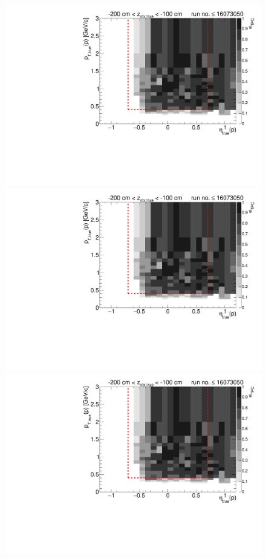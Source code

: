 \begin{figure}[hb]
{  \includegraphics[width=\linewidth,page=6]{graphics/eff/Eff2D_TPC_proton_Plus_RunRange1.pdf}\\
  \includegraphics[width=\linewidth,page=8]{graphics/eff/Eff2D_TPC_proton_Plus_RunRange1.pdf}\\
  \includegraphics[width=\linewidth,page=10]{graphics/eff/Eff2D_TPC_proton_Plus_RunRange1.pdf}
}%
\end{figure}
